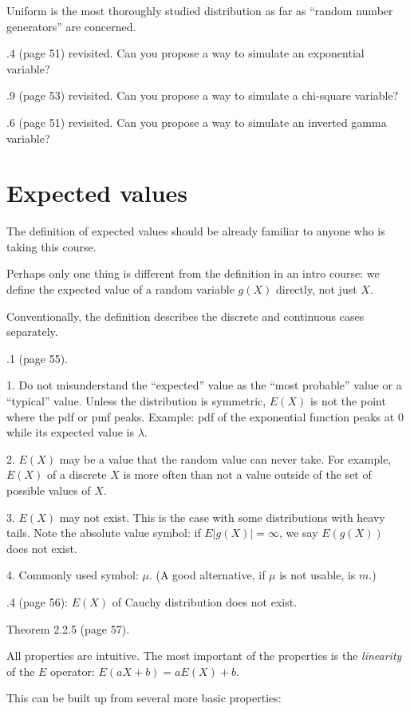 \documentclass[12pt]{article}
\begin{document}
Uniform is the most thoroughly studied distribution as far as ``random
number generators'' are concerned.

.4 (page 51) revisited.
Can you propose a way to simulate an exponential variable?

.9 (page 53) revisited.
Can you propose a way to simulate a chi-square variable?

.6 (page 51) revisited.
Can you propose a way to simulate an inverted gamma variable?


\section{Expected values}

The definition of expected values should be already familiar to anyone
who is taking this course.

Perhaps only one thing is different from the definition in an intro
course: we define the expected value of a random variable $g(X)$
directly, not just $X$.

Conventionally, the definition describes the discrete and continuous
cases separately.

.1 (page 55).

\alert[Remarks]%
1. Do not misunderstand the ``expected'' value as the ``most probable''
value or a ``typical'' value.
Unless the distribution is symmetric, $E(X)$ is not the point where the
pdf or pmf peaks. Example: pdf of the exponential function peaks at $0$
while its expected value is $\lambda$.

2. $E(X)$ may be a value that the random value can never take.
For example, $E(X)$ of a discrete $X$ is more often than not a value
outside of the set of possible values of $X$.

3. $E(X)$ may not exist. This is the case with some distributions with
heavy tails.
Note the absolute value symbol:
if $E|g(X)| = \infty$, we say $E(g(X))$ does not exist.

4. Commonly used symbol: $\mu$. (A good alternative, if $\mu$ is not
usable, is $m$.)

.4 (page 56): $E(X)$ of Cauchy distribution does not exist.

\alert[Properties]%
Theorem 2.2.5 (page 57).

All properties are intuitive.
The most important of the properties is the \emph{linearity} of the
$E$ operator: $E(aX + b) = aE(X) + b$.

This can be built up from several more basic properties:
\end{document}
